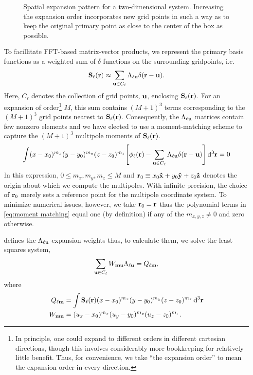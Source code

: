 \begin{figure}
  \centering
  \caption{\label{fig:expansion grid}Spatial expansion pattern for a two-dimensional system.
    Increasing the expansion order incorporates new grid points in such a way as to keep the original primary point as close to the center of the box as possible.
  }
\end{figure}

To facillitate FFT-based matrix-vector products, we represent the primary basis functions as a weighted sum of $\delta$-functions on the surrounding gridpoints, i.e.
\begin{equation}
  \vb{S}_\ell(\vb{r}) \approx \sum_{\vb{u} \in C_{\ell}} \Lambda_{\ell\vb{u}} \delta(\vb{r} - \vb{u}).
  \label{eq:grid linear combination}
\end{equation}
Here, $C_\ell$ denotes the collection of grid points, $\vb{u}$, enclosing $\vb{S}_\ell(\vb{r})$.
For an expansion of order\footnote{In principle, one could expand to different orders in different cartesian directions, though this involves considerably more bookkeeping for relatively little benefit. Thus, for convenience, we take ``the expansion order'' to mean the expansion order in every direction.} $M$, this sum contains $(M + 1)^3$ terms corresponding to the $(M + 1)^3$ grid points nearest to $\vb{S}_\ell(\vb{r})$.
Consequently, the $\Lambda_{\ell \vb{u}}$ matrices contain few nonzero elements and we have elected to use a moment-matching scheme to capture the $(M + 1)^3$ multipole moments of $\vb{S}_\ell(\vb{r})$.
\begin{equation}
  \int (x - x_0)^{m_x}(y - y_0)^{m_y}(z - z_0)^{m_z} \qty[\phi_\ell(\vb{r}) - \sum_{\vb{u} \in C_\ell}\Lambda_{\ell\vb{u}}\delta(\vb{r} - \vb{u})] \dd[3]{\vb{r}} = 0
  \label{eq:moment matching}
\end{equation}
In this expression, $0 \le m_x, m_y, m_z \le M$ and $\vb{r}_0 \equiv x_0 \vu{x} + y_0 \vu{y} + z_0\vu{z}$ denotes the origin about which we compute the multipoles.
With infinite precision, the choice of $\vb{r}_0$ merely sets a reference point for the multipole coordinate system.
To minimize numerical issues, however, we take $\vb{r}_0 = \vb{r}$ thus the polynomial terms in \cref{eq:moment matching} equal one (by definition) if any of the $m_{x,y,z} \not = 0$ and zero otherwise.

 defines the $\Lambda_{\ell \vb{u}}$ expansion weights thus, to calculate them, we solve the least-squares system,
\begin{equation}
  \sum_{\vb{u} \in C_\ell} W_{\vb{m}\vb{u}}\Lambda_{\ell\vb{u}} = Q_{\ell\vb{m}},
  \label{eq:expansion matrix system}
\end{equation}
where
\begin{subequations}
  \begin{align}
    Q_{\ell \vb{m}} &= \int \vb{S}_\ell(\vb{r}) (x - x_0)^{m_x} (y - y_0)^{m_y} (z - z_0)^{m_z} \dd[3]{\vb{r}} \\
    W_{\vb{m}\vb{u}} &= (u_x - x_0)^{m_x} (u_y - y_0)^{m_y} (u_z - z_0)^{m_z}.
  \end{align}
\end{subequations}
